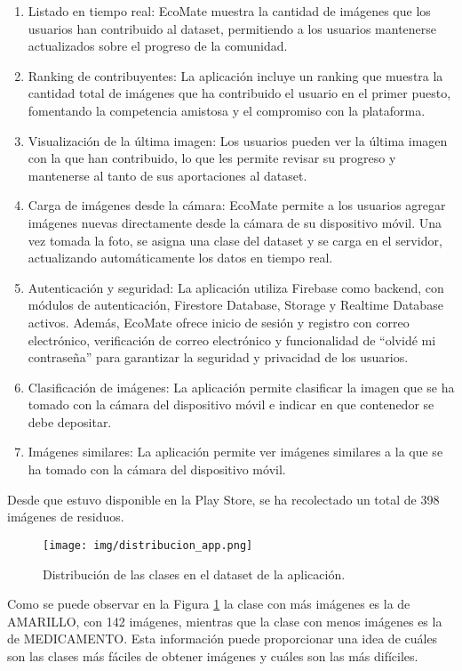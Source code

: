 \documentclass[10pt,a4paper,twocolumn,twoside]{article}
\begin{document}
\begin{enumerate}
  \item Listado en tiempo real: EcoMate muestra la cantidad de imágenes que los usuarios han contribuido al dataset, permitiendo a los usuarios mantenerse actualizados sobre el progreso de la comunidad.
  \item Ranking de contribuyentes: La aplicación incluye un ranking que muestra la cantidad total de imágenes que ha contribuido el usuario en el primer puesto, fomentando la competencia amistosa y el compromiso con la plataforma.
  \item Visualización de la última imagen: Los usuarios pueden ver la última imagen con la que han contribuido, lo que les permite revisar su progreso y mantenerse al tanto de sus aportaciones al dataset.
  \item Carga de imágenes desde la cámara: EcoMate permite a los usuarios agregar imágenes nuevas directamente desde la cámara de su dispositivo móvil. Una vez tomada la foto, se asigna una clase del dataset y se carga en el servidor, actualizando automáticamente los datos en tiempo real.
  \item Autenticación y seguridad: La aplicación utiliza Firebase como backend, con módulos de autenticación, Firestore Database, Storage y Realtime Database activos. Además, EcoMate ofrece inicio de sesión y registro con correo electrónico, verificación de correo electrónico y funcionalidad de ``olvidé mi contraseña'' para garantizar la seguridad y privacidad de los usuarios.
  \item Clasificación de imágenes: La aplicación permite clasificar la imagen que se ha tomado con la cámara del dispositivo móvil e indicar en que contenedor se debe depositar.
  \item Imágenes similares: La aplicación permite ver imágenes similares a la que se ha tomado con la cámara del dispositivo móvil.
\end{enumerate}

Desde que estuvo disponible en la Play Store, se ha recolectado un total de 398 imágenes de residuos.

\begin{figure}[h]
  \centering
  \texttt{[image: img/distribucion\_app.png]}
  \caption{Distribución de las clases en el dataset de la aplicación.}
  \label{fig:distribucion_app}
\end{figure}

Como se puede observar en la Figura \ref{fig:distribucion_app} la clase con más imágenes es la de AMARILLO, con 142 imágenes, mientras que la clase con menos imágenes es la de MEDICAMENTO. Esta información puede proporcionar una idea de cuáles son las clases más fáciles de obtener imágenes y cuáles son las más difíciles.
\end{document}
